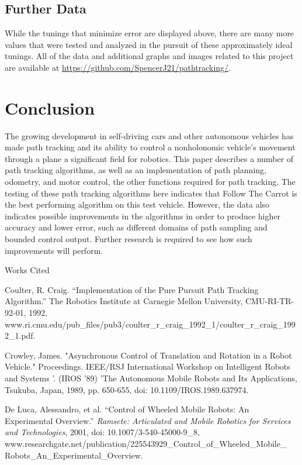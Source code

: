 \documentclass[12pt]{article}
\newcommand{\bibent}{\noindent \hangindent 40pt}
\newenvironment{workscited}{\newpage \begin{center} Works Cited \end{center}}{\newpage }
\begin{document}
\begin{flushleft}
\begin{figure}[H]
\endminipage
\end{figure}

\subsection{Further Data}

While the tunings that minimize error are displayed above, there are many more values that were tested and analyzed in the pursuit of these approximately ideal tunings. All of the data and additional graphs and images related to this project are available at \href{https://github.com/SpencerJ21/pathtracking/tree/develop/scripts/analysis}{\underline{https://github.com/SpencerJ21/pathtracking/}}.

\section{Conclusion}

The growing development in self-driving cars and other autonomous vehicles has made path tracking and its ability to control a nonholonomic vehicle's movement through a plane a significant field for robotics. This paper describes a number of path tracking algorithms, as well as an implementation of path planning, odometry, and motor control, the other functions required for path tracking. The testing of these path tracking algorithms here indicates that Follow The Carrot is the best performing algorithm on this test vehicle. However, the data also indicates possible improvements in the algorithms in order to produce higher accuracy and lower error, such as different domains of path sampling and bounded control output. Further research is required to see how such improvements will perform.

\begin{workscited}

\bibent
Coulter, R. Craig. “Implementation of the Pure Pursuit Path Tracking Algorithm.” The Robotics Institute at Carnegie Mellon University, CMU-RI-TR-92-01, 1992, www.ri.cmu.edu/pub\_files/pub3/coulter\_r\_craig\_1992\_1/coulter\_r\_craig\_1992\_1.pdf.

\bibent
Crowley, James. "Asynchronous Control of Translation and Rotation in a Robot Vehicle." Proceedings. IEEE/RSJ International Workshop on Intelligent Robots and Systems '. (IROS '89) 'The Autonomous Mobile Robots and Its Applications, Tsukuba, Japan, 1989, pp. 650-655, doi: 10.1109/IROS.1989.637974.

\bibent
De Luca, Alessandro, et al. “Control of Wheeled Mobile Robots: An Experimental Overview.” \textit{Ramsete: Articulated and Mobile Robotics for Services and Technologies}, 2001, doi: 10.1007/3-540-45000-9\_8, www.researchgate.net/publication/225543929\_Control\_of\_Wheeled\_Mobile\_\\Robots\_An\_Experimental\_Overview.


\end{workscited}
\end{flushleft}
\end{document}
